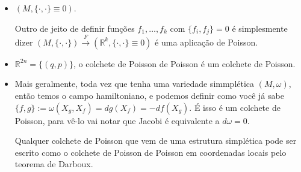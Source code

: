 \begin{example}\leavevmode
\begin{itemize}
\item \((M,\{\cdot ,\cdot \}\equiv0)\).

	Outro de jeito de definir funções \(f_1,\ldots,f_k\) com \(\{f_i,f_j\}=0\) é simplesmente dizer \((M,\{\cdot ,\cdot \})\xrightarrow{F}(\mathbb{R}^k,\{\cdot ,\cdot \} \equiv 0)\) é uma aplicação de Poisson.
\item \(\mathbb{R}^{2n}=\{(q,p)\}\), o colchete de Poisson de Poisson é um colchete de Poisson.
\item Mais geralmente, toda vez que tenha uma variedade simmplética \((M,\omega)\), então temos o campo hamiltoniano, e podemos definir como você já sabe \(\{f,g\}:=\omega(X_g,X_f)=dg(X_f)=-df(X_g)\). É isso é um colchete de Poisson, para vê-lo vai notar que Jacobi é equivalente a \(d\omega=0\).

	Qualquer colchete de Poisson que vem de uma estrutura simplética pode ser escrito como o colchete de Poisson de Poisson em coordenadas locais pelo teorema de Darboux.


\end{itemize}
\end{example}
